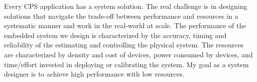 \documentclass[10pt]{article}
\begin{document}
Every CPS application has a system solution. The real challenge is in designing solutions that navigate the trade-off between performance and resources in a systematic manner and work in the real-world at scale. %
The performance of the embedded system we design is characterized by the accuracy, timing and reliability of the estimating and controlling the physical system. The resources are characterized by density and cost of devices, power consumed by devices, and time/effort invested in deploying or calibrating the system. My goal as a system designer is to achieve high performance with low resources. %

 

\end{document}
